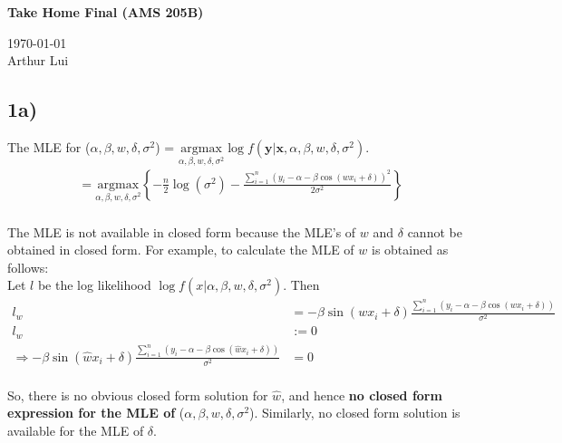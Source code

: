 \documentclass[11pt]{article}
\def\wl{\par \vspace{\baselineskip}\noindent}
\def\hline{ \textcolor{lgrey}{\hrulefill} }
\newcommand{\p}[1]{\left(#1\right)}
\newcommand{\bc}[1]{ \left\{#1\right\} }
\begin{document}
\begin{center}
  {\huge \textbf{Take Home Final (AMS 205B)}
  }\\
  \wl
  \noindent\today\\
  Arthur Lui\\
  \hline
\end{center}


\def\ci{\cos(wx_i+\delta)}
\def\si{\sin(wx_i+\delta)}
\def\hi{\alpha-\beta\ci}
\def\hci{\cos(\hat w x_i+\delta)}
\def\hsi{\sin(\hat w x_i+\delta)}
\def\hhi{\alpha-\beta\hci}
\def\suml{\sum_{i=1}^n}
\def\mlevec{(\alpha,\beta,w,\delta,\sigma^2)}
\def\hmlevec{\hat\alpha,\hat\beta,\hat w,\hat\delta,\hat\sigma^2}

\subsection*{1a)}
The MLE for ($\alpha,\beta,w,\delta,\sigma^2$) = $\underset{\alpha,\beta,w,\delta,\sigma^2}{\text{argmax}}\log f(\bm y|\bm x,\alpha,\beta,w,\delta,\sigma^2)$.
\[
\begin{aligned}
  &= \underset{\alpha,\beta,w,\delta,\sigma^2}{\text{argmax}}\bc{-\frac{n}{2} \log(\sigma^2) - \frac{\sum_{i=1}^n \p{y_i-\alpha-\beta \cos\p{wx_i+\delta}}^2}{2\sigma^2}}\\
\end{aligned}
\]

\noindent
The MLE is not available in closed form because the MLE's of $w$ and $\delta$ cannot be obtained in closed form. For example, to calculate the MLE of $w$ is obtained as follows:\\

\noindent
Let $l$ be the log likelihood $\log f(x|\alpha,\beta,w,\delta,\sigma^2)$. Then
\[
\begin{aligned}
  l_w &=  -\beta\si\frac{\suml\p{y_i-\hi}}{\sigma^2}\\
  l_w &:=0\\
  \Rightarrow -\beta\hsi\frac{\suml\p{y_i-\hhi}}{\sigma^2}&=0\\
\end{aligned}
\]

\noindent
So, there is no obvious closed form solution for $\hat w$, and hence \textbf{no closed form expression for the MLE of} ($\alpha,\beta,w,\delta,\sigma^2$). Similarly, no closed form solution is available for the MLE of $\delta$.\\
\end{document}
